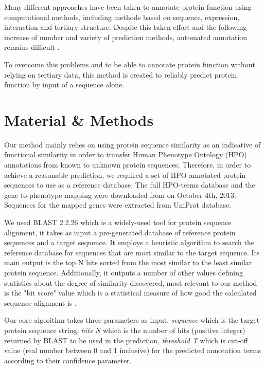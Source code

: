 \documentclass{bioinfo}
\begin{document}
Many different approaches have been taken to annotate protein function using computational methods, including methods based on sequence, expression, interaction and tertiary structure. Despite this taken effort and the following increase of number and variety of prediction methods, automated annotation remains difficult \citep{Rodrigues07}.

To overcome this problems and to be able to annotate protein function without relying on tertiary data, this method is created to reliably predict protein function by input of a sequence alone.

\section{Material \& Methods}

Our method mainly relies on using protein sequence similarity as an indicative of functional similarity in order to transfer Human Phenotype Ontology (HPO) annotations from known to unknown protein sequences. Therefore, in order to achieve a reasonable prediction, we required a set of HPO annotated protein sequences to use as a reference database. The full HPO-terms database and the gene-to-phenotype mapping were downloaded from \cite{hpodb} on October 4th, 2013. Sequences for the mapped genes were extracted from UniProt \cite{uniprot} database.

We used BLAST 2.2.26 \cite{blastweb} which is a widely-used tool for protein sequence alignment, it takes as input a pre-generated database of reference protein sequences and a target sequence. It employs a heuristic algorithm to search the reference database for sequences that are most similar to the target sequence. Its main output is the top N hits sorted from the most similar to the least similar protein sequence. Additionally, it outputs a number of other values defining statistics about the degree of similarity discovered, most relevant to our method is the "bit score" value which is a statistical measure of how good the calculated sequence alignment is \cite{blastscore}.

Our core algorithm takes three parameters as input, \textit{sequence} which is the target protein sequence string, \textit{hits N} which is the number of hits (positive integer) returned by BLAST to be used in the prediction, \textit{threshold T} which is cut-off value (real number between 0 and 1 inclusive) for the predicted annotation terms according to their confidence parameter.
\end{document}
